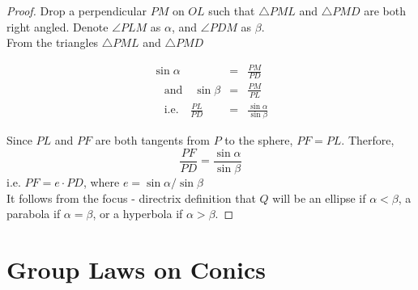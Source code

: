 \begin{proof}
  Drop a perpendicular $PM$ on $OL$ such that $\triangle PML$ and $\triangle PMD$ are both right angled.
  Denote $\angle PLM$ as $\alpha$, and $\angle PDM$ as $\beta$.\\
  From the triangles  $\triangle PML$ and $\triangle PMD$ 
  
  \begin{eqnarray*}
    \sin{\alpha}&=&\frac{PM}{PD}\\ 
    \quad \textrm{and} \quad \sin{\beta}&=&\frac{PM}{PL}\\
    \quad \textrm{i.e.} \quad \frac{PL}{PD}&=&\frac{\sin{\alpha}}{\sin{\beta}}
  \end{eqnarray*}

  Since $PL$ and $PF$ are both tangents from $P$ to the sphere, $PF=PL$. Therfore,
\[\frac{PF}{PD}=\frac{\sin{\alpha}}{\sin{\beta}}\]
  i.e. $PF=e\cdot PD$, where $e=\sin{\alpha}/\sin{\beta}$\\
  It follows from the focus - directrix definition that $Q$ will be an ellipse if $\alpha<\beta$,
  a parabola if $\alpha=\beta$, or a hyperbola if $\alpha>\beta$.
\end{proof}


\section{Group Laws on Conics}

